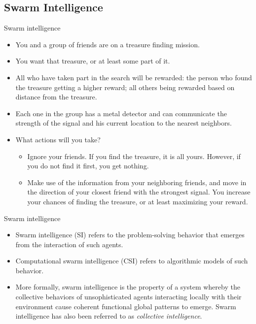 \documentclass[aspectratio=169,compress,10pt]{beamer}
\begin{document}
\subsection{Swarm Intelligence}
\begin{frame}{Swarm intelligence}
\begin{itemize}
	\item You and a group of friends are on a treasure finding mission. 
	\item You want that treasure, or at least some part of it.
	\item All who have taken part in the search will be rewarded: the person who found the treasure getting a higher reward; all others being rewarded based on distance from the treasure.
	\item Each one in the group has a metal detector and can communicate the strength of the signal and his current location to the nearest neighbors.
	\item What actions will you take? 
	\begin{itemize}
		\item Ignore your friends. If you find the treasure, it is all yours. However, if you do not find it first, you get nothing.
		\item Make use of the information from your neighboring friends, and move in the direction of your closest friend with the strongest signal.
		You increase your chances of finding the treasure, or at least maximizing your reward.
	\end{itemize}
\end{itemize}
\end{frame}

\begin{frame}{Swarm intelligence}
\begin{itemize}
	\item Swarm intelligence (SI) refers to the problem-solving behavior that emerges from the interaction of such agents.
	\item Computational swarm intelligence (CSI) refers to algorithmic models of such behavior.
	\item More formally, swarm intelligence is the property of a system whereby the collective behaviors of unsophisticated agents interacting locally with their environment cause coherent functional global patterns to emerge.
	Swarm intelligence has also been referred to as \emph{collective intelligence}.
\end{itemize}
\end{frame}
\end{document}
